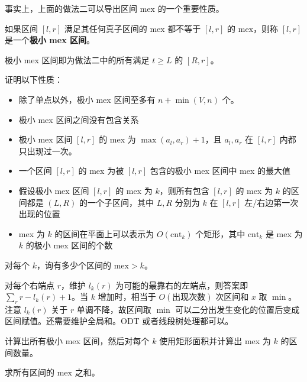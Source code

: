事实上，上面的做法二可以导出区间 $\mathrm{mex}$ 的一个重要性质。
\begin{definition}[极小 mex 区间]
    如果区间 $[l,r]$ 满足其任何真子区间的 $\mathrm{mex}$ 都不等于 $[l,r]$ 的 $\mathrm{mex}$，则称 $[l,r]$ 是一个\textbf{极小 mex 区间}。
\end{definition}
\begin{theorem}
    极小 mex 区间即为做法二中的所有满足 $t\ge L$ 的 $[R,r]$。
\end{theorem}
\begin{exercise}
    证明以下性质：
    \begin{itemize}
        \item 除了单点以外，极小 mex 区间至多有 $n+\min(V,n)$ 个。
        \item 极小 mex 区间之间没有包含关系
        \item 极小 mex 区间 $[l,r]$ 的 mex 为 $\max(a_l,a_r)+1$，且 $a_l,a_r$ 在 $[l,r]$ 内都只出现过一次。
        \item 一个区间 $[l,r]$ 的 mex 为被 $[l,r]$ 包含的极小 mex 区间中 mex 的最大值
        \item 假设极小 mex 区间 $[l,r]$ 的 mex 为 $k$，则所有包含 $[l,r]$ 的 mex 为 $k$ 的区间都是 $(L,R)$ 的一个子区间，其中 $L,R$ 分别为 $k$ 在 $[l,r]$ 左/右边第一次出现的位置
        \item mex 为 $k$ 的区间在平面上可以表示为 $O(\mathrm{cnt}_k)$ 个矩形，其中 $\mathrm{cnt}_k$ 是 mex 为 $k$ 的极小 mex 区间的个数
    \end{itemize}
\end{exercise}

\begin{exercise}
    对每个 $k$，询有多少个区间的 $\mathrm{mex}>k$。
\end{exercise}
\begin{solution}[做法一]
    对每个右端点 $r$，维护 $l_k(r)$ 为可能的最靠右的左端点，则答案即 $\sum_r r-l_k(r)+1$。当 $k$ 增加时，相当于 $O(\text{出现次数})$ 次区间和 $x$ 取 $\min$。注意 $l_k(r)$ 关于 $r$ 单调不降，故区间取 $\min$ 可以二分出发生变化的位置后变成区间赋值。还需要维护全局和。ODT 或者线段树处理都可以。
\end{solution}
\begin{solution}[做法二]
    计算出所有极小 mex 区间，然后对每个 $k$ 使用矩形面积并计算出 mex 为 $k$ 的区间数量。
\end{solution}
\begin{exercise}
    求所有区间的 $\mathrm{mex}$ 之和。
\end{exercise}

